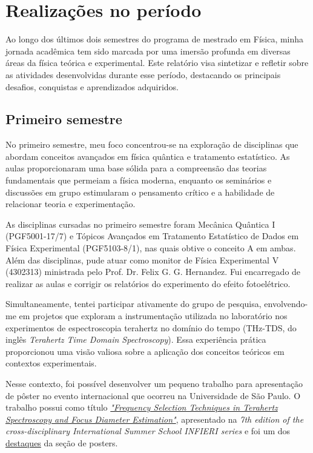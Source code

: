 \documentclass[a4paper,12pt,oneside]{article}
\begin{document}
\clearpage

\pagestyle{plain} %

\section{Realizações no período}

\qquad Ao longo dos últimos dois semestres do programa de mestrado em Física, minha jornada acadêmica tem sido marcada por uma imersão profunda em diversas áreas da física teórica e experimental. Este relatório visa sintetizar e refletir sobre as atividades desenvolvidas durante esse período, destacando os principais desafios, conquistas e aprendizados adquiridos.

\subsection{Primeiro semestre}
\qquad No primeiro semestre, meu foco concentrou-se na exploração de disciplinas que abordam conceitos avançados em física quântica e tratamento estatístico. As aulas proporcionaram uma base sólida para a compreensão das teorias fundamentais que permeiam a física moderna, enquanto os seminários e discussões em grupo estimularam o pensamento crítico e a habilidade de relacionar teoria e experimentação. 

As disciplinas cursadas no primeiro semestre foram Mecânica Quântica I (PGF5001-17/7) e Tópicos Avançados em
Tratamento Estatístico de Dados em Física Experimental (PGF5103-8/1), nas quais obtive o conceito A em ambas. Além das disciplinas, pude atuar como monitor de Física Experimental V (4302313) ministrada pelo Prof. Dr. Felix G. G. Hernandez. Fui encarregado de realizar as aulas e corrigir os relatórios do experimento do efeito fotoelétrico.

Simultaneamente, tentei participar ativamente do grupo de pesquisa, envolvendo-me em projetos que exploram a instrumentação utilizada no laboratório nos experimentos de espectroscopia terahertz no domínio do tempo (THz-TDS, do inglês \textit{Terahertz Time Domain Spectroscopy}). Essa experiência prática proporcionou uma visão valiosa sobre a aplicação dos conceitos teóricos em contextos experimentais. 

Nesse contexto, foi possível desenvolver um pequeno trabalho para apresentação de pôster no evento internacional que ocorreu na Universidade de São Paulo. O trabalho possui como título \href{https://indico.cern.ch/event/1221962/timetable/#115-frequency-selection-techni}{\textit{"Frequency Selection Techniques in Terahertz Spectroscopy and Focus Diameter Estimation"}}, apresentado na \textit{7th edition of the cross-disciplinary International Summer School INFIERI series} e foi um dos \href{https://portal.if.usp.br/imprensa/pt-br/node/4391}{destaques} da seção de posters.
\end{document}
